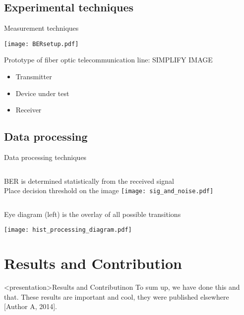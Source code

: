 
  \subsection{Experimental techniques} %
  \label{sub:experimental_techniques}
  


  \begin{frame}{Measurement techniques}
   \begin{center}
    \texttt{[image: BERsetup.pdf]}
   \end{center}
    Prototype of fiber optic telecommunication line: \alert{SIMPLIFY IMAGE}
    \begin{itemize}
      \item Transmitter
      \item Device under test
      \item Receiver
    \end{itemize}
  \end{frame}

  \subsection{Data processing} %
  \label{sub:data_processing}
  
  \begin{frame}{Data processing techniques}
    \begin{columns}
        BER is determined statistically from the received signal\\
        \alert{Place decision threshold on the image}
        \texttt{[image: sig\_and\_noise.pdf]}
    \end{columns}
    Eye diagram (left) is the overlay of all possible transitions
    \begin{center}
      \texttt{[image: hist\_processing\_diagram.pdf]}
    \end{center}
  \end{frame}








\section{Results and Contribution}
  \begin{frame}<presentation>{Results and Contributinon}
  To sum up, we have done this and that. These results are important and cool,
  they were published elsewhere [Author A, 2014].
  \label{slide:results}
  \end{frame}

